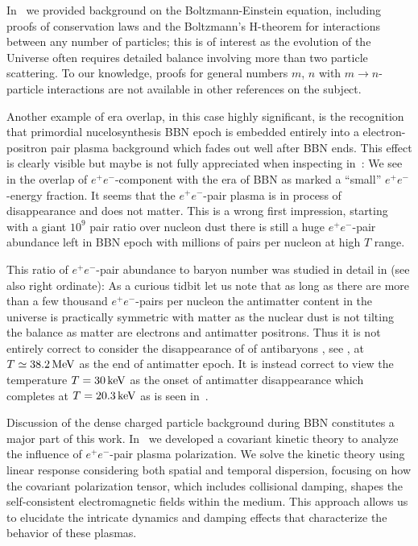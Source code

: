 In~ we provided background on the Boltzmann-Einstein equation, including proofs of conservation laws and the Boltzmann's H-theorem for interactions between any number of particles; this is of interest as the evolution of the Universe often requires detailed balance involving more than two particle scattering. To our knowledge, proofs for general numbers $m$, $n$ with $m\to n$-particle interactions are not available in other references on the subject.

Another example of era overlap, in this case highly significant, is the recognition that primordial nucelosynthesis BBN epoch is embedded entirely into a electron-positron pair plasma background which fades out well after BBN ends. This effect is clearly visible but maybe is not fully appreciated when inspecting in~: We see in the overlap of $e^+e^-$-component with the era of BBN as marked a ``small'' $e^+e^-$-energy fraction. It seems that the $e^+e^-$-pair plasma is in process of disappearance and does not matter. This is a wrong first impression,  starting with a giant $10^9$ pair ratio over nucleon dust there is still a huge $e^+e^-$-pair abundance left in BBN epoch with millions of pairs per nucleon at high $T$ range.

This ratio of $e^+e^-$-pair abundance to baryon number was studied  in detail in  (see also   right ordinate):  As a curious tidbit let us note that as long as there are more than a few thousand $e^+e^-$-pairs per nucleon the antimatter content in the universe is practically symmetric with matter as the nuclear dust is not tilting the balance as matter are electrons and antimatter positrons. Thus it is not entirely correct to consider the disappearance of of antibaryons , see , at $T\simeq 38.2\text{\,MeV}$ as the end of antimatter epoch. It is instead correct to view the temperature $T=30\text{\,keV}$ as the onset of antimatter disappearance which completes at $T=20.3\text{\,keV}$ as is seen in~.

Discussion of the dense charged particle background during BBN constitutes a major part of this work. In~ we developed a covariant kinetic theory to analyze the influence of $e^+e^-$-pair plasma polarization. We solve the kinetic theory using linear response considering both spatial and temporal dispersion, focusing on how the covariant polarization tensor, which includes collisional damping, shapes the self-consistent electromagnetic fields within the medium. This approach allows us to elucidate the intricate dynamics and damping effects that characterize the behavior of these plasmas.


